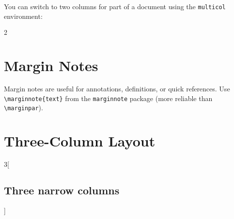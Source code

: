 \documentclass[12pt, a4paper]{article}
\begin{document}
You can switch to two columns for part of a document using the
\texttt{multicol} environment:

\begin{multicols}{2}
\lipsum[3]


\lipsum[4]
\end{multicols}

\section{Margin Notes}

Margin notes are useful for annotations,
definitions, or quick references. Use \verb|\marginnote{text}| from the
\texttt{marginnote} package (more reliable than \verb|\marginpar|).

\lipsum[5]

\section{Three-Column Layout}

\begin{multicols}{3}[\subsection*{Three narrow columns}]
\small
\lipsum[6]
\end{multicols}
\end{document}
